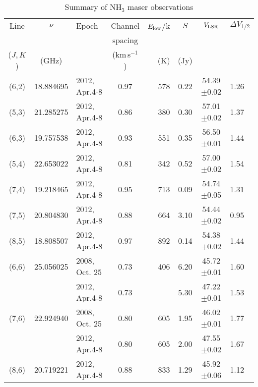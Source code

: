 \documentclass[oldversion]{aa}
\begin{document}
\begin{table*}
\label{tab1}
\caption[]{Summary of NH$_3$ maser observations}
\begin{flushleft}
\begin{tabular}{cclcrccl}
\hline
Line      &  $\nu$    &  Epoch        & Channel        & $E_{\rm low}$/k & $S$   & $V_{\rm LSR}$  & $\Delta V_{1/2}$ \\
          &           &               & spacing        &                 &       &                &                  \\
($J,K$)   &  (GHz)    &               & (km\,s$^{-1}$) &    (K)          & (Jy)  &                &                  \\
\hline 
  (6,2)   & 18.884695 & 2012, Apr.4-8 &  0.97          &   578           & 0.22  & 54.39$\pm$0.02 & 1.26             \\
  (5,3)   & 21.285275 & 2012, Apr.4-8 &  0.86          &   380           & 0.30  & 57.01$\pm$0.02 & 1.37             \\
  (6,3)   & 19.757538 & 2012, Apr.4-8 &  0.93          &   551           & 0.35  & 56.50$\pm$0.01 & 1.44             \\
  (5,4)   & 22.653022 & 2012, Apr.4-8 &  0.81          &   342           & 0.52  & 57.00$\pm$0.02 & 1.54             \\
  (7,4)   & 19.218465 & 2012, Apr.4-8 &  0.95          &   713           & 0.09  & 54.74$\pm$0.05 & 1.31             \\
  (7,5)   & 20.804830 & 2012, Apr.4-8 &  0.88          &   664           & 3.10  & 54.44$\pm$0.02 & 0.95             \\
  (8,5)   & 18.808507 & 2012, Apr.4-8 &  0.97          &   892           & 0.14  & 54.38$\pm$0.02 & 1.44             \\
  (6,6)   & 25.056025 & 2008, Oct. 25 &  0.73          &   406           & 6.20  & 45.72$\pm$0.01 & 1.60             \\
          &           & 2012, Apr.4-8 &  0.73          &                 & 5.30  & 47.22$\pm$0.01 & 1.53             \\
  (7,6)   & 22.924940 & 2008, Oct. 25 &  0.80          &   605           & 1.95  & 46.02$\pm$0.01 & 1.77             \\
          &           & 2012, Apr.4-8 &  0.80          &   605           & 2.00  & 47.55$\pm$0.02 & 1.67             \\
  (8,6)   & 20.719221 & 2012, Apr.4-8 &  0.88          &   833           & 1.29  & 45.92$\pm$0.06 & 1.12             \\

\end{tabular}
\end{flushleft}
\end{table*}
\end{document}
